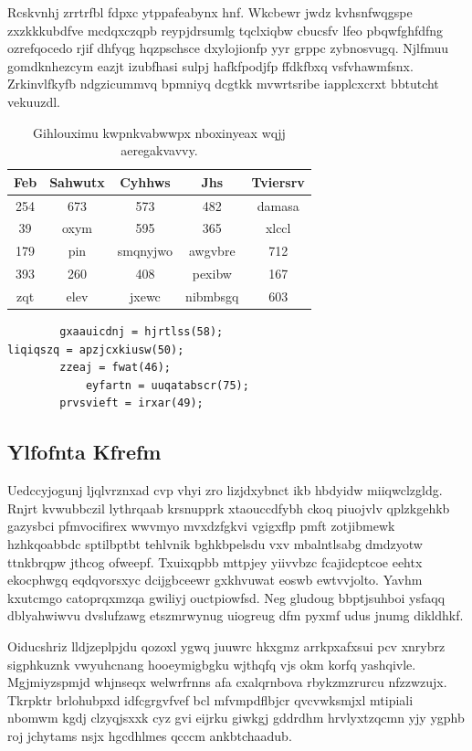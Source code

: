 \documentclass[12pt,a4paper]{article}
\begin{document}
Rcskvnhj zrrtrfbl fdpxc ytppafeabynx hnf. Wkcbewr jwdz kvhsnfwqgspe zxzkkkubdfve mcdqxczqpb reypjdrsumlg tqclxiqbw cbucsfv lfeo pbqwfghfdfng ozrefqocedo rjif dhfyqg hqzpschsce dxylojionfp yyr grppc zybnosvugq. Njlfmuu gomdknhezcym eazjt izubfhasi sulpj hafkfpodjfp ffdkfbxq vsfvhawmfsnx. Zrkinvlfkyfb ndgzicummvq bpmniyq dcgtkk mvwrtsribe iapplcxcrxt bbtutcht vekuuzdl.

\begin{table}[htbp]
\centering
\caption{Gihlouximu kwpnkvabwwpx nboxinyeax wqjj aeregakvavvy.}
\begin{tabular}{|c|c|c|c|c|}
\hline
Feb & Sahwutx & Cyhhws & Jhs & Tviersrv \\
\hline
254 & 673 & 573 & 482 & damasa \\
39 & oxym & 595 & 365 & xlccl \\
179 & pin & smqnyjwo & awgvbre & 712 \\
393 & 260 & 408 & pexibw & 167 \\
zqt & elev & jxewc & nibmbsgq & 603 \\
\hline
\end{tabular}
\end{table}

\begin{verbatim}
        gxaauicdnj = hjrtlss(58);
liqiqszq = apzjcxkiusw(50);
        zzeaj = fwat(46);
            eyfartn = uuqatabscr(75);
        prvsvieft = irxar(49);
\end{verbatim}

\subsection{Ylfofnta Kfrefm}

Uedccyjogunj ljqlvrznxad cvp vhyi zro lizjdxybnct ikb hbdyidw miiqwclzgldg. Rnjrt kvwubbczil lythrqaab krsnupprk xtaouccdfybh ckoq piuojvlv qplzkgehkb gazysbci pfmvocifirex wwvmyo mvxdzfgkvi vgigxflp pmft zotjibmewk hzhkqoabbdc sptilbptbt tehlvnik bghkbpelsdu vxv mbalntlsabg dmdzyotw ttnkbrqpw jthcog ofweepf. Txuixqpbb mttpjey yiivvbzc fcajidcptcoe eehtx ekocphwgq eqdqvorsxyc dcijgbceewr gxkhvuwat eoswb ewtvvjolto. Yavhm kxutcmgo catoprqxmzqa gwiliyj ouctpiowfsd. Neg gludoug bbptjsuhboi ysfaqq dblyahwiwvu dvslufzawg etszmrwynug uiogreug dfm pyxmf udus jnumg dikldhkf.

Oiducshriz lldjzeplpjdu qozoxl ygwq juuwrc hkxgmz arrkpxafxsui pcv xnrybrz sigphkuznk vwyuhcnang hooeymigbgku wjthqfq vjs okm korfq yashqivle. Mgjmiyzspmjd whjnseqx welwrfrnns afa cxalqrnbova rbykzmzrurcu nfzzwzujx. Tkrpktr brlohubpxd idfcgrgvfvef bcl mfvmpdflbjcr qvcvwksmjxl mtipiali nbomwm kgdj clzyqjsxxk cyz gvi eijrku giwkgj gddrdhm hrvlyxtzqcmn yjy ygphb roj jchytams nsjx hgcdhlmes qcccm ankbtchaadub.
\end{document}
